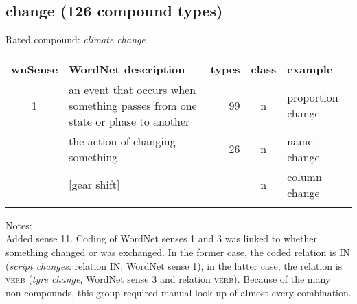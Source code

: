 \subsection{change    (126 compound types)}
Rated compound: \emph{climate change}

\vspace*{1ex}

\noindent
\begin{longtable}{c>{\raggedright\arraybackslash}p{5cm}rc>{\raggedright\arraybackslash}p{2cm}}\lsptoprule
{\small wnSense}&WordNet description&types&class&example\\\midrule
1&an event that occurs when something passes from one state or phase to another&99&n&proportion change\\\tablevspace
3&the action of changing something&26&n&name change\\\tablevspace
11&{}[gear shift]&&n&column change\\\lspbottomrule
\end{longtable}

\noindent
Notes:\\
Added sense 11. Coding of WordNet senses 1 and 3 was linked to whether something changed or was exchanged. In the former case, the coded relation is IN (\emph{script changes}: relation IN, WordNet sense 1), in the latter case, the relation is \textsc{verb} (\emph{tyre change}, WordNet sense 3 and relation \textsc{verb}). Because of the many non-compounds, this group required manual look-up of almost every combination.



